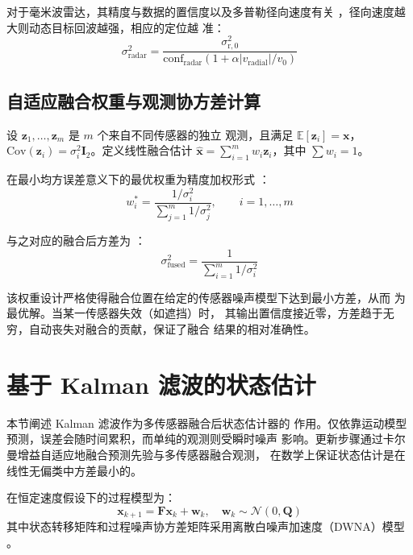 \documentclass[12pt,a4paper]{ctexart}
\begin{document}
对于毫米波雷达，其精度与数据的置信度以及多普勒径向速度有关
\cite{jacobs2023radar}，径向速度越大则动态目标回波越强，相应的定位越
准\cite{jacobs2023radar}：
\begin{equation}
\sigma_{\mathrm{radar}}^2 =
\frac{\sigma_{\mathrm{r},0}^2}
{\mathrm{conf}_{\mathrm{radar}}(1 + \alpha |v_{\mathrm{radial}}|/v_0)}
\end{equation}

\subsection{自适应融合权重与观测协方差计算}

设 $\mathbf{z}_1, \dots, \mathbf{z}_m$ 是 $m$ 个来自不同传感器的独立
观测，且满足 $\mathbb{E}[\mathbf{z}_i] = \mathbf{x}$，
$\mathrm{Cov}(\mathbf{z}_i) = \sigma_i^2 \mathbf{I}_2$。定义线性融合估计
$\hat{\mathbf{x}} = \sum_{i=1}^{m} w_i \mathbf{z}_i$，其中
$\sum w_i = 1$。

在最小均方误差意义下的最优权重为精度加权形式
\cite{aitken1935,li2003fusion}：
\begin{equation}
w_i^{*} =
\frac{1/\sigma_i^2}{\sum_{j=1}^{m} 1/\sigma_j^2},
\qquad i = 1,\dots,m
\end{equation}

与之对应的融合后方差为
\cite{aitken1935,li2003fusion,sun2004fusion}：
\begin{equation}
\sigma_{\mathrm{fused}}^2 =
\frac{1}{\sum_{i=1}^{m} 1/\sigma_i^2}
\end{equation}

该权重设计严格使得融合位置在给定的传感器噪声模型下达到最小方差，从而
为最优解\cite{aitken1935,li2003fusion}。当某一传感器失效（如遮挡）时，
其输出置信度接近零，方差趋于无穷，自动丧失对融合的贡献，保证了融合
结果的相对准确性。

\section{基于 Kalman 滤波的状态估计}

本节阐述 Kalman 滤波\cite{kalman1960}作为多传感器融合后状态估计器的
作用。仅依靠运动模型预测，误差会随时间累积，而单纯的观测则受瞬时噪声
影响。更新步骤通过卡尔曼增益自适应地融合预测先验与多传感器融合观测，
在数学上保证状态估计是在线性无偏类中方差最小的\cite{kalman1960}。

在恒定速度假设下的过程模型为\cite{bar2001estimation}：
\begin{equation}
\mathbf{x}_{k+1} = \mathbf{F}\mathbf{x}_k + \mathbf{w}_k,
\quad \mathbf{w}_k \sim \mathcal{N}(0, \mathbf{Q})
\end{equation}
其中状态转移矩阵和过程噪声协方差矩阵采用离散白噪声加速度（DWNA）模型
\cite{bar2001estimation}。
\end{document}
